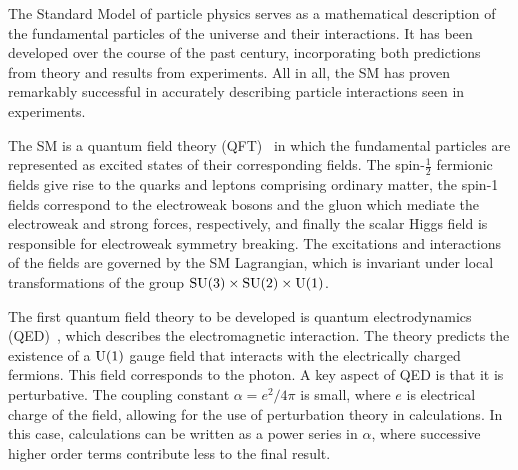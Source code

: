 ﻿%

The Standard Model of particle physics serves as a mathematical description of the fundamental particles of the universe and their interactions.
It has been developed over the course of the past century, incorporating both predictions from theory and results from experiments.
All in all, the SM has proven remarkably successful in accurately describing particle interactions seen in experiments.

The SM is a quantum field theory (QFT)~\cite{1995.Weinberg, 1995.Peskin} in which the fundamental particles are represented as excited states of their corresponding fields.
The spin-$\frac{1}{2}$ fermionic fields give rise to the quarks and leptons comprising ordinary matter, the spin-1 fields correspond to the electroweak bosons and the gluon which mediate the electroweak and strong forces, respectively, and finally the scalar Higgs field is responsible for electroweak symmetry breaking.
The excitations and interactions of the fields are governed by the SM Lagrangian, which is invariant under local transformations of the group $\textrm{SU}(3)\times\textrm{SU}(2)\times\textrm{U}(1)$.

The first quantum field theory to be developed is quantum electrodynamics (QED)~\cite{1950.Feynman.QED}, which describes the electromagnetic interaction.
The theory predicts the existence of a $\textrm{U}(1)$ gauge field that interacts with the electrically charged fermions.
This field corresponds to the photon.
A key aspect of QED is that it is perturbative.
The coupling constant $\alpha = e^2/4\pi$ is small, where $e$ is electrical charge of the field, allowing for the use of perturbation theory in calculations.
In this case, calculations can be written as a power series in $\alpha$, where successive higher order terms contribute less to the final result.

